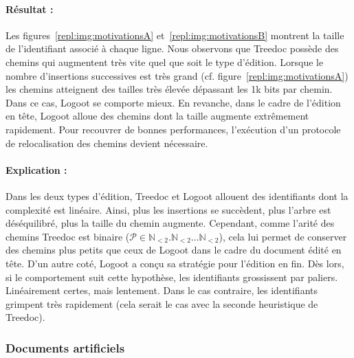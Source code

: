 \paragraph{Résultat :} Les figures~\ref{repl:img:motivationsA}
et~\ref{repl:img:motivationsB} montrent la taille de l'identifiant associé à
chaque ligne. Nous observons que Treedoc possède des chemins qui augmentent très
vite quel que soit le type d'édition. Lorsque le nombre d'insertions successives
est très grand (cf. figure~\ref{repl:img:motivationsA}) les chemins atteignent
des tailles très élevée dépassant les 1k bits par chemin. Dans ce cas, Logoot se
comporte mieux. En revanche, dans le cadre de l'édition en tête, Logoot alloue
des chemins dont la taille augmente extrêmement rapidement. Pour recouvrer de
bonnes performances, l'exécution d'un protocole de relocalisation des chemins
devient nécessaire.

\paragraph{Explication :} Dans les deux types d'édition, Treedoc et Logoot
allouent des identifiants dont la complexité est linéaire. Ainsi, plus les
insertions se succèdent, plus l'arbre est déséquilibré, plus la taille du chemin
augmente. Cependant, comme l'arité des chemins Treedoc est binaire
($\mathcal{P}\in \mathbb{N}_{<2}.\mathbb{N}_{<2}\ldots\mathbb{N}_{<2}$), cela
lui permet de conserver des chemins plus petits que ceux de Logoot dans le cadre
du document édité en tête. D'un autre coté, Logoot a conçu sa stratégie pour
l'édition en fin. Dès lors, si le comportement suit cette hypothèse, les
identifiants grossissent par paliers. Linéairement certes, mais lentement. Dans
le cas contraire, les identifiants grimpent très rapidement (cela serait le cas
avec la seconde heuristique de Treedoc).

\subsubsection{Documents artificiels}


